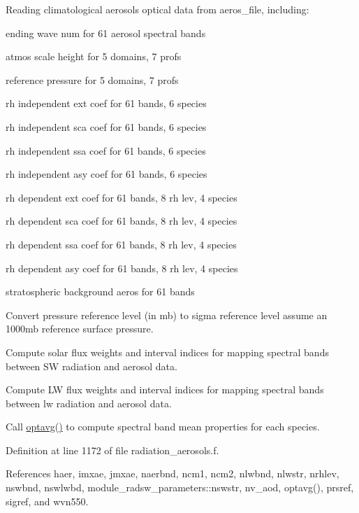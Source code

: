 \begin{DoxyEnumerate}
\item Reading climatological aerosols optical data from aeros\+\_\+file, including\+:
\begin{DoxyItemize}
\item ending wave num for 61 aerosol spectral bands
\item atmos scale height for 5 domains, 7 profs
\item reference pressure for 5 domains, 7 profs
\item rh independent ext coef for 61 bands, 6 species
\item rh independent sca coef for 61 bands, 6 species
\item rh independent ssa coef for 61 bands, 6 species
\item rh independent asy coef for 61 bands, 6 species
\item rh dependent ext coef for 61 bands, 8 rh lev, 4 species
\item rh dependent sca coef for 61 bands, 8 rh lev, 4 species
\item rh dependent ssa coef for 61 bands, 8 rh lev, 4 species
\item rh dependent asy coef for 61 bands, 8 rh lev, 4 species
\item stratospheric background aeros for 61 bands
\end{DoxyItemize}
\item Convert pressure reference level (in mb) to sigma reference level assume an 1000mb reference surface pressure.
\item Compute solar flux weights and interval indices for mapping spectral bands between SW radiation and aerosol data.
\item Compute LW flux weights and interval indices for mapping spectral bands between lw radiation and aerosol data.
\item Call \hyperlink{group__module__radiation__aerosols_ga637761b6110739f2d96322e2ddcc1291}{optavg()} to compute spectral band mean properties for each species. 
\end{DoxyEnumerate}

Definition at line 1172 of file radiation\+\_\+aerosols.\+f.



References haer, imxae, jmxae, naerbnd, ncm1, ncm2, nlwbnd, nlwstr, nrhlev, nswbnd, nswlwbd, module\+\_\+radsw\+\_\+parameters\+::nswstr, nv\+\_\+aod, optavg(), prsref, sigref, and wvn550.



